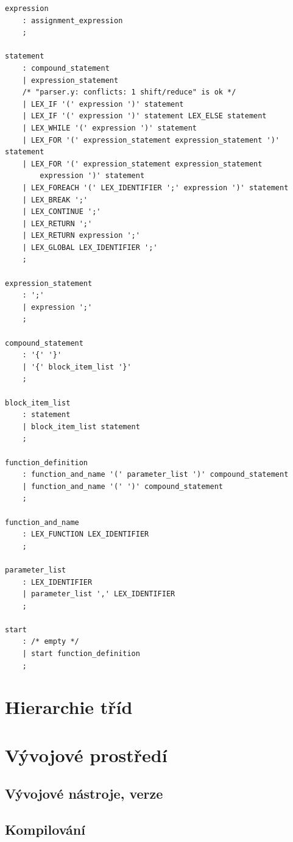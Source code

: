 \documentclass[11pt,twoside,a4paper]{book}
\begin{document}
\begin{verbatim}
expression
    : assignment_expression
    ;

statement
    : compound_statement
    | expression_statement
    /* "parser.y: conflicts: 1 shift/reduce" is ok */
    | LEX_IF '(' expression ')' statement
    | LEX_IF '(' expression ')' statement LEX_ELSE statement
    | LEX_WHILE '(' expression ')' statement
    | LEX_FOR '(' expression_statement expression_statement ')' statement
    | LEX_FOR '(' expression_statement expression_statement
        expression ')' statement
    | LEX_FOREACH '(' LEX_IDENTIFIER ';' expression ')' statement
    | LEX_BREAK ';'
    | LEX_CONTINUE ';'
    | LEX_RETURN ';'
    | LEX_RETURN expression ';'
    | LEX_GLOBAL LEX_IDENTIFIER ';'
    ;

expression_statement
    : ';'
    | expression ';'
    ;

compound_statement
    : '{' '}'
    | '{' block_item_list '}'
    ;

block_item_list
    : statement
    | block_item_list statement
    ;

function_definition
    : function_and_name '(' parameter_list ')' compound_statement
    | function_and_name '(' ')' compound_statement
    ;

function_and_name
    : LEX_FUNCTION LEX_IDENTIFIER
    ;

parameter_list
    : LEX_IDENTIFIER
    | parameter_list ',' LEX_IDENTIFIER
    ;

start
    : /* empty */
    | start function_definition
    ;
\end{verbatim}



\chapter{Hierarchie tříd}



\chapter{Vývojové prostředí}

\section{Vývojové nástroje, verze}
\section{Kompilování}
\end{document}
